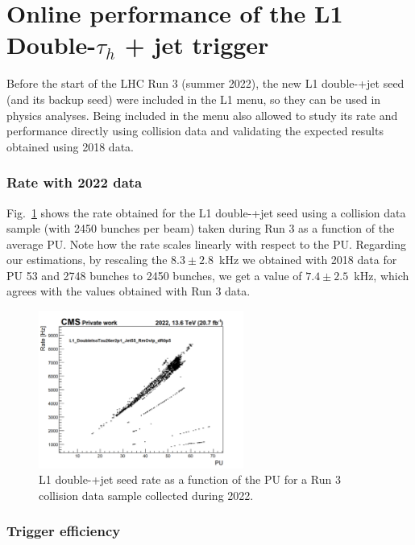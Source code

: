 \documentclass[../main.tex]{subfiles}
\begin{document}
\section{Online performance of the L1 Double-$\tau_h$ + jet trigger}

Before the start of the LHC Run 3 (summer 2022), the new L1 double-\tauh{}+jet seed (and its backup seed) were included in the L1 menu, so they can be used in physics analyses. Being included in the menu also allowed to study its rate and performance directly using collision data and validating the expected results obtained using 2018 data.

\subsubsection{Rate with 2022 data}

Fig.~\ref{hh:fig:l1_rate_run3} shows the rate obtained for the L1 double-\tauh{}+jet seed using a collision data sample (with 2450 bunches per beam) taken during Run 3 as a function of the average PU. Note how the rate scales linearly with respect to the PU. Regarding our estimations, by rescaling the $8.3\pm2.8$~kHz we obtained with 2018 data for PU 53 and 2748 bunches to 2450 bunches, we get a value of $7.4\pm2.5$~kHz, which agrees with the values obtained with Run 3 data.


\begin{figure}[h!]
\begin{center}
\includegraphics[width=0.6\textwidth]{Images/L1_rate}
\end{center}
\caption{L1 double-\tauh{}+jet seed rate as a function of the PU for a Run 3 collision data sample collected during 2022.}
\label{hh:fig:l1_rate_run3}
\end{figure}

\subsubsection{Trigger efficiency}
\end{document}
